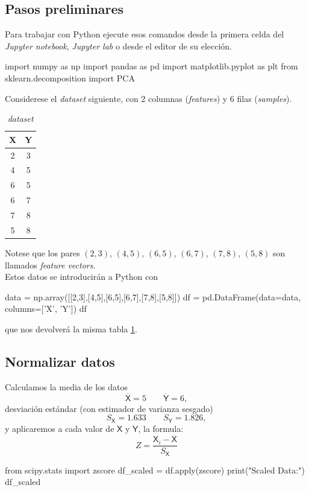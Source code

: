 \subsection{Pasos preliminares}
Para trabajar con Python ejecute esos comandos desde la primera celda del \textit{Jupyter notebook}, \textit{Jupyter lab} o desde el editor de su elección.
\begin{jupyter}{1}
import numpy as np
import pandas as pd
import matplotlib.pyplot as plt
from sklearn.decomposition import PCA
\end{jupyter}
Considerese el \textit{dataset} siguiente, con 2 columnas (\textit{features}) y 6 filas (\textit{samples}).
\begin{table}[H]
\centering
\begin{tabular}{cc}
\sffamily X & \sffamily Y \\ 
\hline
\rowcolor[HTML]{EFEFEF} 
2 & 3 \\
4 & 5 \\
\rowcolor[HTML]{EFEFEF} 
6 & 5 \\
6 & 7 \\
\rowcolor[HTML]{EFEFEF} 
7 & 8 \\
5 & 8
\end{tabular}
\caption{\textit{dataset}}\label{datasetMath}
\end{table}
Notese que los pares $(2,3)$, $(4,5)$, $(6,5)$, $(6,7)$, $(7,8)$, $(5,8)$ son llamados \textit{feature vectors}.\\

Estos datos se introducirán a Python con
\begin{jupyter}{2}
data = np.array([[2,3],[4,5],[6,5],[6,7],[7,8],[5,8]])
df = pd.DataFrame(data=data, columns=['X', 'Y'])
df
\end{jupyter}
que nos devolverá la misma tabla \ref{datasetMath}.

\subsection{Normalizar datos}
\begin{minipage}[c]{0.48\textwidth}
Calculamos la media de los datos
\[ \overline{\mathsf{X}}=5 \qquad \overline{\mathsf{Y}}=6, \]
desviación estándar (con estimador de varianza sesgado)
\[ S_{\mathsf{X}}=1.633 \qquad S_{\mathsf{Y}}=1.826, \]
y aplicaremos a cada valor de $\mathsf{X}$ y $\mathsf{Y}$, la formula:
\[ Z=\frac{\mathsf{X}_i-\overline{\mathsf{X}}}{S_{\mathsf{X}}} \]
\end{minipage}
\hfill\vrule\hfill
\begin{minipage}[c]{0.48\textwidth}
\begin{jupyter}{3}
from scipy.stats import zscore
df_scaled = df.apply(zscore)
print("Scaled Data:")
df_scaled
\end{jupyter}
\end{minipage}\\

